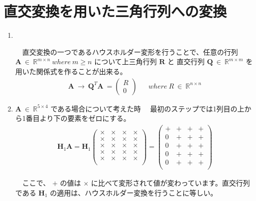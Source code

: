 \documentclass[dvipdfmx,10pt,presentation]{beamer}
\begin{document}
\section{直交変換を用いた三角行列への変換}
\label{sec:orgaac233b}
\begin{enumerate}
\item 　
\label{sec:org38e4a80}


　直交変換の一つであるハウスホルダー変形を行うことで、任意の行列 \(\bm{A}\ \in \ \mathbb{R}^{m \times n}\ where\ m \geq n\) について上三角行列 \(\bm{R}\) と 直交行列 \(\bm{Q}\ \in\ \mathbb{R}^{m \times m}\) を用いた関係式を作ることが出来る。\\

\begin{align*}
\bm{A}\ \rightarrow\ \bm{Q}^T\bm{A}\ = \begin{pmatrix}R \\ 0\end{pmatrix}
&& where\ R\ \in\ \mathbb{R}^{n\times n}
\end{align*}

\item \(\bm{A}\ \in\ \mathbb{R}^{5\times4}\) である場合について考えた時
\label{sec:org8797f80}
　最初のステップでは1列目の上から1番目より下の要素をゼロにする。\\

\begin{align*}
\bm{H}_1\bm{A} = \bm{H}_1
\begin{pmatrix}
\times & \times & \times & \times \\
\times & \times & \times & \times \\
\times & \times & \times & \times \\
\times & \times & \times & \times \\
\times & \times & \times & \times \\
\end{pmatrix}
=
\begin{pmatrix}
+ & + & + & + \\
0 & + & + & + \\
0 & + & + & + \\
0 & + & + & + \\
0 & + & + & + \\
\end{pmatrix}
\end{align*}

　ここで、 \(+\) の値は \(\times\) に比べて変形されて値が変わっています。直交行列である \(\bm{H}_1\) の適用は、ハウスホルダー変換を行うことに等しい。\\


\end{enumerate}
\end{document}
